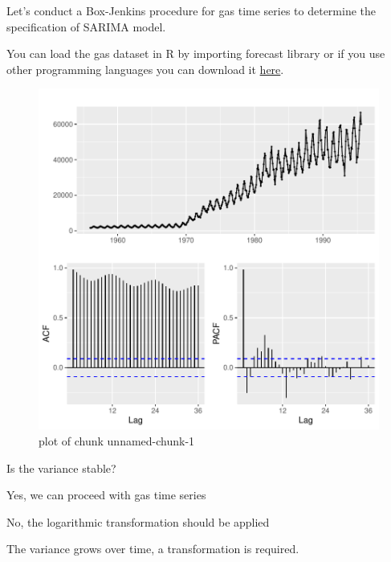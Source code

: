 
\begin{question}
Let's conduct a Box-Jenkins procedure for gas time series to determine the specification of SARIMA model.

You can load the gas dataset in R by importing forecast library or if you use other programming languages you can download it \href{https://github.com/vincentarelbundock/Rdatasets/blob/master/csv/forecast/gas.csv}{here}.

\begin{figure}[H]
\centering
\includegraphics{unnamed-chunk-1-1-4.pdf}
\caption{plot of chunk unnamed-chunk-1}
\end{figure}

Is the variance stable?
\begin{answerlist}
  \item Yes, we can proceed with gas time series
  \item No, the logarithmic transformation should be applied
\end{answerlist}
\end{question}

\begin{solution}
The variance grows over time, a transformation is required.
\end{solution}

